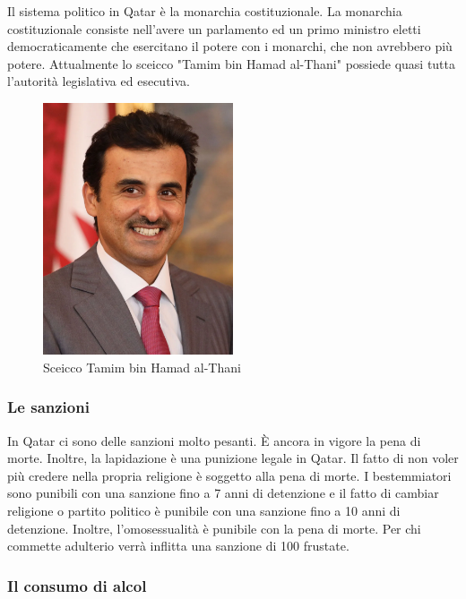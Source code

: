 \documentclass[a4paper, 12pt]{article}
\begin{document}
Il sistema politico in Qatar è la monarchia costituzionale. La monarchia costituzionale consiste nell'avere un parlamento ed un primo ministro eletti democraticamente che esercitano il potere con i monarchi, che non avrebbero più potere. Attualmente lo sceicco "Tamim bin Hamad al-Thani" possiede quasi tutta l'autorità legislativa ed esecutiva.

\begin{figure}[h]
    \centering
    \includegraphics[width=0.5\textwidth]{images/sheikh.png}
    \caption{Sceicco Tamim bin Hamad al-Thani}
\end{figure}



\subsubsection{Le sanzioni}

In Qatar ci sono delle sanzioni molto pesanti. È ancora in vigore la pena di morte. Inoltre, la lapidazione è una punizione legale in Qatar. Il fatto di non voler più credere nella propria religione è soggetto alla pena di morte. I bestemmiatori sono punibili con una sanzione fino a 7 anni di detenzione e il fatto di cambiar religione o partito politico è punibile con una sanzione fino a 10 anni di detenzione. Inoltre, l'omosessualità è punibile con la pena di morte. Per chi commette adulterio verrà inflitta una sanzione di 100 frustate.

\subsubsection{Il consumo di alcol}
\end{document}
